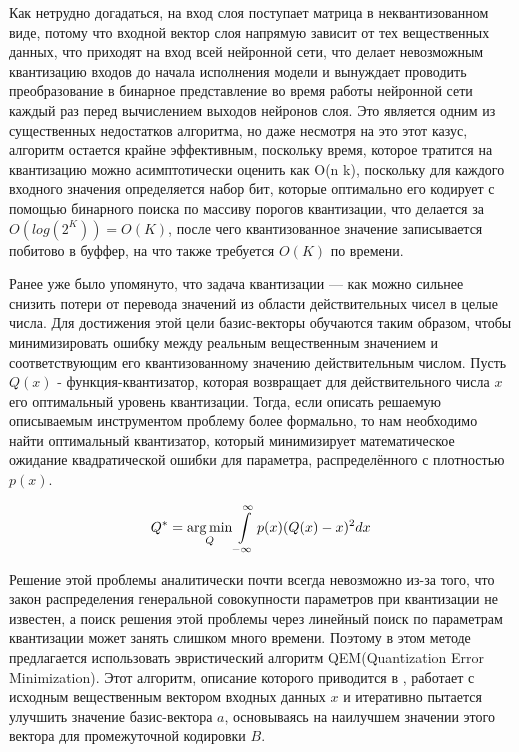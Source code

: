 Как нетрудно догадаться, на вход слоя поступает матрица в неквантизованном виде, потому что входной вектор слоя напрямую зависит от тех вещественных данных, что приходят на вход всей нейронной сети, что делает невозможным квантизацию входов до начала исполнения модели и вынуждает проводить преобразование в бинарное представление во время работы нейронной сети каждый раз перед вычислением выходов нейронов слоя. Это является одним из существенных недостатков алгоритма, но даже несмотря на это этот казус, алгоритм остается крайне эффективным, поскольку время, которое тратится на квантизацию можно асимптотически оценить как O(n k), поскольку для каждого входного значения определяется набор бит, которые оптимально его кодирует с помощью бинарного поиска по массиву порогов квантизации, что делается за $O(log(2^K)) = O(K)$, после чего квантизованное значение записывается побитово в  буффер, на что также требуется $O(K)$ по времени.

Ранее уже было упомянуто, что задача квантизации — как можно сильнее снизить потери от перевода значений из области действительных чисел в целые числа. Для достижения этой цели базис-векторы обучаются таким образом, чтобы минимизировать ошибку между реальным вещественным значением и соответствующим его квантизованному значению действительным числом. Пусть $Q(x)$ - функция-квантизатор, которая возвращает для действительного числа $x$ его оптимальный уровень квантизации. Тогда, если описать решаемую описываемым инструментом проблему более формально, то нам необходимо найти оптимальный квантизатор, который минимизирует математическое ожидание квадратической ошибки для параметра, распределённого с плотностью $p(x)$.

\begin{equation}
Q^{*} = \operatorname*{arg\,min} \limits_Q \int \limits_{- \infty}^{\infty} p(x) (Q(x) - x)^2 dx
\end{equation}

Решение этой проблемы аналитически почти всегда невозможно из-за того, что закон распределения  генеральной совокупности параметров при квантизации не известен, а поиск решения этой проблемы через линейный поиск по параметрам квантизации может занять слишком много времени. Поэтому в этом методе предлагается использовать эвристический алгоритм QEM(Quantization Error Minimization). Этот алгоритм, описание которого приводится в \cite{lq}, работает с исходным вещественным вектором входных данных $x$ и итеративно пытается улучшить значение базис-вектора $a$, основываясь на наилучшем значении этого вектора для промежуточной кодировки  $B$.

